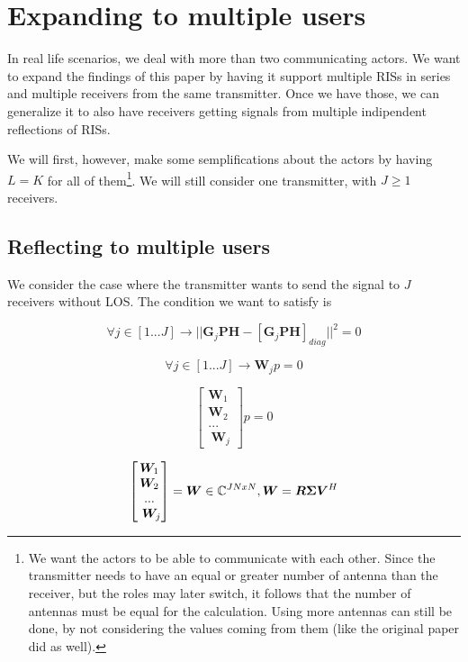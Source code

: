 \section{Expanding to multiple users}

In real life scenarios, we deal with more than two communicating actors. We want to expand the findings of this paper by having it support multiple RISs in series and multiple receivers from the same transmitter. Once we have those, we can generalize it to also have receivers getting signals from multiple indipendent reflections of RISs.

We will first, however, make some semplifications about the actors by having $L = K$ for all of them\footnote{We want the actors to be able to communicate with each other. Since the transmitter needs to have an equal or greater number of antenna than the receiver, but the roles may later switch, it follows that the number of antennas must be equal for the calculation. Using more antennas can still be done, by not considering the values coming from them (like the original paper did as well).}. We will still consider one transmitter, with $J \ge 1$ receivers.

\subsection{Reflecting to multiple users}

We consider the case where the transmitter wants to send the signal to $J$ receivers without LOS. The condition we want to satisfy is

\begin{equation}
  \forall j \in [1...J] \rightarrow || \bm{G}_j\bm{PH} - [\bm{G}_j\bm{PH}]_{diag} || ^2 = 0
\end{equation}

\begin{equation}
  \forall j \in [1...J] \rightarrow \bm{W}_jp = 0
\end{equation}

\begin{equation}
  \begin{bmatrix}
    \bm{W}_1  \\
    \bm{W}_ 2 \\
    ...       \\\
    \bm{W}_j
  \end{bmatrix}
  p = 0
\end{equation}

\begin{equation}
  \begin{bmatrix}
    \bm{W}_1  \\
    \bm{W}_ 2 \\
    ...       \\\
    \bm{W}_j
  \end{bmatrix}
  = \bm{W} \in \mathbb{C} ^ {JNxN}, \bm{W} = \bm{R \Sigma V}^H
\end{equation}


